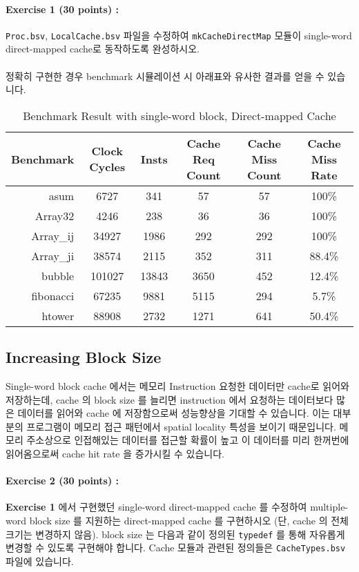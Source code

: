 \documentclass{article}
\begin{document}
\noindent \paragraph{\bf Exercise 1 (30 points) :} \texttt{Proc.bsv}, \texttt{LocalCache.bsv} 파일을 수정하여
\texttt{mkCacheDirectMap} 모듈이 single-word direct-mapped cache로 동작하도록 완성하시오.
\\\\
정확히 구현한 경우 benchmark 시뮬레이션 시 아래표와 유사한 결과를 얻을 수 있습니다. 

\begin{table}[h]
\centering
\begin{tabular}{|r|c|c|c|c|c|}
\hline
Benchmark & Clock Cycles & Insts & Cache Req Count & Cache Miss Count & Cache Miss Rate \\
\hline
asum & 6727 & 341 & 57 & 57 & 100\% \\
Array32 & 4246 & 238 & 36 & 36 & 100\% \\
Array\_ij & 34927 & 1986 & 292 & 292 & 100\% \\
Array\_ji & 38574 & 2115 & 352 & 311 & 88.4\% \\
bubble & 101027 & 13843 & 3650 & 452 & 12.4\% \\
fibonacci & 67235 & 9881 & 5115 & 294 & 5.7\% \\
htower & 88908 & 2732 & 1271 & 641 & 50.4\% \\
\hline
\end{tabular}
\caption{Benchmark Result with single-word block, Direct-mapped Cache}
\end{table}

\subsection{Increasing Block Size}
Single-word block cache 에서는 메모리 Instruction 요청한 데이터만 cache로 읽어와 저장하는데,
cache 의 block size 를 늘리면 instruction 에서 요청하는 데이터보다 많은 데이터를 읽어와
cache 에 저장함으로써 성능향상을 기대할 수 있습니다.
이는 대부분의 프로그램이 메모리 접근 패턴에서 spatial locality 특성을 보이기 때문입니다.
메모리 주소상으로 인접해있는 데이터를 접근할 확률이 높고 이 데이터를 미리 한꺼번에 
읽어옴으로써 cache hit rate 을 증가시킬 수 있습니다.

\noindent \paragraph{\bf Exercise 2 (30 points) :} 
\textbf{Exercise 1} 에서 구현했던 single-word direct-mapped cache 를 수정하여
multiple-word block size 를 지원하는 direct-mapped cache 를 구현하시오
(단, cache 의 전체 크기는 변경하지 않음). block size 는 다음과 같이 정의된
\texttt{typedef} 를 통해 자유롭게 변경할 수 있도록 구현해야 합니다.
Cache 모듈과 관련된 정의들은 \texttt{CacheTypes.bsv} 파일에 있습니다.
\end{document}
